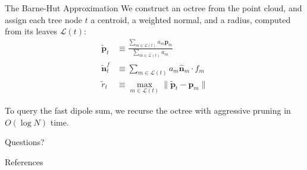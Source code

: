\documentclass[10pt]{beamer}
\newcommand{\bp}{\mathbf{p}}
\newcommand{\bn}{\mathbf{n}}
\begin{document}
\begin{frame}{The Barne-Hut Approximation}
    We construct an \alert{octree} from the point cloud, and assign each tree node \(t\) a centroid, a weighted normal, and a radius, computed from its leaves \(\mathcal L(t)\):
    \begin{align*}
        \tilde{\bp}_t & \equiv \frac{\sum_{m \in \mathcal L(t)} a_m \bp_m}{\sum_{m \in \mathcal L(t)} a_m} \\
        \tilde{\bn}^f_t & \equiv \sum_{m \in \mathcal L(t)} a_m \widehat{\bn}_m \cdot f_m \\
        \tilde{r}_t & \equiv \max_{m \in \mathcal L(t)} \|\tilde{\bp}_t - \bp_m\|
    \end{align*}

    To query the \alert{fast} dipole sum, we recurse the octree with aggressive pruning in \(O(\log N)\) time.
\end{frame}

\begin{frame}[standout]
  Questions?
\end{frame}


\begin{frame}[allowframebreaks]{References}

  
  

\end{frame}
\end{document}
